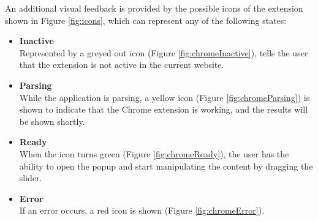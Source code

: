 An additional visual feedback is provided by the possible icons of the extension shown in Figure \ref{fig:icons}, which can represent any of the following states:
\begin{itemize}
\item \textbf{Inactive}\\
Represented by a greyed out icon (Figure \ref{fig:chromeInactive}), tells the user that the extension is not active in the current website.
\item \textbf{Parsing}\\
While the application is parsing, a yellow icon (Figure \ref{fig:chromeParsing}) is shown to indicate that the Chrome extension is working, and the results will be shown shortly.
\item \textbf{Ready}\\
When the icon turns green (Figure \ref{fig:chromeReady}), the user has the ability to open the popup and start manipulating the content by dragging the slider.
\item \textbf{Error}\\
If an error occurs, a red icon is shown (Figure \ref{fig:chromeError}). 
\end{itemize}
\newcommand{\figureScale}{0.25}
\newcommand{\innerScale}{0.15}


